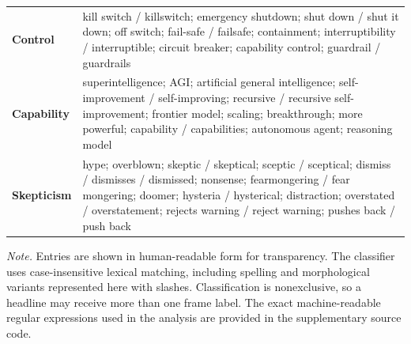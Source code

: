 \elsevierclasstrue\documentclass[preprint,12pt]{elsarticle}%
\begin{document}
\begin{center}
\begin{longtable}{
>{\raggedright\arraybackslash}p{}
>{\raggedright\arraybackslash}p{}}
\textbf{Control} &
kill switch / killswitch;
emergency shutdown;
shut down / shut it down;
off switch;
fail-safe / failsafe;
containment;
interruptibility / interruptible;
circuit breaker;
capability control;
guardrail / guardrails
\\[0.5em]

\textbf{Capability} &
superintelligence;
AGI;
artificial general intelligence;
self-improvement / self-improving;
recursive / recursive self-improvement;
frontier model;
scaling;
breakthrough;
more powerful;
capability / capabilities;
autonomous agent;
reasoning model
\\[0.5em]

\textbf{Skepticism} &
hype;
overblown;
skeptic / skeptical;
sceptic / sceptical;
dismiss / dismisses / dismissed;
nonsense;
fearmongering / fear mongering;
doomer;
hysteria / hysterical;
distraction;
overstated / overstatement;
rejects warning / reject warning;
pushes back / push back
\\

\end{longtable}

\vspace{-0.5em}

\begin{minipage}{0.92\textwidth}
\scriptsize
\textit{Note.} Entries are shown in human-readable form for transparency. The classifier uses case-insensitive lexical matching, including spelling and morphological variants represented here with slashes. Classification is nonexclusive, so a headline may receive more than one frame label. The exact machine-readable regular expressions used in the analysis are provided in the supplementary source code.
\end{minipage}

\end{center}
\end{document}
